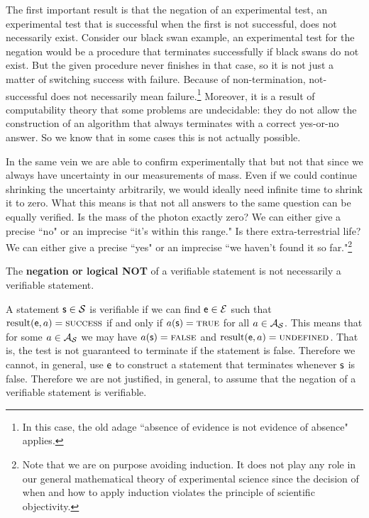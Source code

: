 \documentclass[11pt,letterpaper,fleqn]{memoir} %
\begin{document}
The first important result is that the negation of an experimental test, an experimental test that is successful when the first is not successful, does not necessarily exist. Consider our black swan example, an experimental test for the negation would be a procedure that terminates successfully if black swans do not exist. But the given procedure never finishes in that case, so it is not just a matter of switching success with failure. Because of non-termination, not-successful does not necessarily mean failure.\footnote{In this case, the old adage ``absence of evidence is not evidence of absence" applies.} Moreover, it is a result of computability theory that some problems are undecidable: they do not allow the construction of an algorithm that always terminates with a correct yes-or-no answer. So we know that in some cases this is not actually possible.

In the same vein we are able to confirm experimentally that  but not that  since we always have uncertainty in our measurements of mass. Even if we could continue shrinking the uncertainty arbitrarily, we would ideally need infinite time to shrink it to zero. What this means is that not all answers to the same question can be equally verified. Is the mass of the photon exactly zero? We can either give a precise ``no" or an imprecise ``it's within this range." Is there extra-terrestrial life? We can either give a precise ``yes" or an imprecise ``we haven't found it so far."\footnote{Note that we are on purpose avoiding induction. It does not play any role in our general mathematical theory of experimental science since the decision of when and how to apply induction violates the principle of scientific objectivity.}

\begin{mathSection}
	\begin{remark}
	The \textbf{negation or logical NOT} of a verifiable statement is not necessarily a verifiable statement.
	\end{remark}

	\begin{justification}
		A statement $\mathsf{s} \in \mathcal{S}$ is verifiable if we can find $\mathsf{e} \in \mathcal{E}$ such that $\operatorname{result}(\mathsf{e}, a) = \textsc{success}$ if and only if $a(\mathsf{s}) = \textsc{true}$ for all $a \in \mathcal{A}_{\mathcal{S}}$. This means that for some $a \in \mathcal{A}_{\mathcal{S}}$ we may have $a(\mathsf{s}) = \textsc{false}$ and $\operatorname{result}(\mathsf{e}, a) = \textsc{undefined}$. That is, the test is not guaranteed to terminate if the statement is false. Therefore we cannot, in general, use $\mathsf{e}$ to construct a statement that terminates whenever $\mathsf{s}$ is false. Therefore we are not justified, in general, to assume that the negation of a verifiable statement is verifiable.
	\end{justification}
\end{mathSection}
\end{document}
